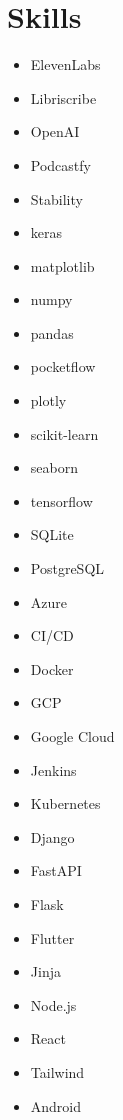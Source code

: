 \documentclass[letterpaper,11pt]{article}
\newenvironment{skillcol}{\begin{itemize}[leftmargin=27.27pt,labelsep=5.47pt,label=$\vcenter{\hbox{\tiny$\bullet$}}$,topsep=0pt,itemsep=3pt,parsep=0pt,partopsep=0pt]}{\end{itemize}}
\begin{document}
\newpage
\vspace*{-22.92pt}
\section{Skills}
\vspace{1.55pt}\noindent\hspace*{0.11pt}%
\begin{minipage}[t]{110.95pt}
\begin{skillcol}
\item ElevenLabs
\item Libriscribe
\item OpenAI
\item Podcastfy
\item Stability
\item keras
\item matplotlib
\item numpy
\item pandas
\item pocketflow
\item plotly
\item scikit-learn
\item seaborn
\item tensorflow
\item SQLite
\item PostgreSQL
\end{skillcol}\end{minipage}%
\begin{minipage}[t]{110.95pt}
\begin{skillcol}
\item Azure
\item CI/CD
\item Docker
\item GCP
\item Google Cloud
\item Jenkins
\item Kubernetes
\item Django
\item FastAPI
\item Flask
\item Flutter
\item Jinja
\item Node.js
\item React
\item Tailwind
\item Android
\end{skillcol}\end{minipage}%
\end{document}
